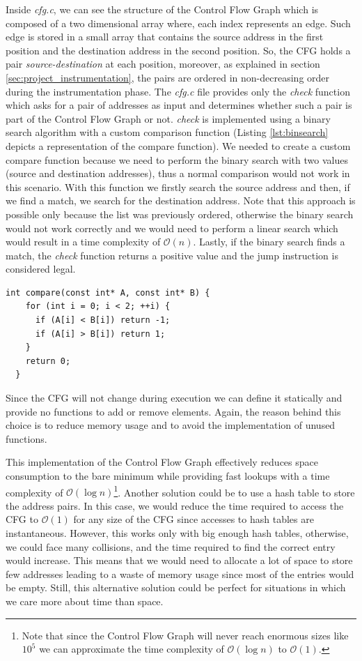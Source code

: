 Inside \textit{cfg.c}, we can see the structure of the Control Flow Graph which is
composed of a two dimensional array where, each index represents an edge. Such edge
is stored in a small array that contains the source address in the first position
and the destination address in the second position. So, the CFG holds a pair \textit{source-destination}
at each position, moreover, as explained in section
\ref{sec:project_instrumentation}, the pairs are ordered in non-decreasing order
during the instrumentation phase. The \textit{cfg.c} file provides only the \textit{check}
function which asks for a pair of addresses as input and determines whether such
a pair is part of the Control Flow Graph or not. \textit{check} is implemented
using a binary search algorithm with a custom comparison function (Listing \ref{lst:binsearch}
depicts a representation of the compare function). We needed to create a custom compare
function because we need to perform the binary search with two values (source
and destination addresses), thus a normal comparison would not work in this
scenario. With this function we firstly search the source address and then, if
we find a match, we search for the destination address. Note that this approach
is possible only because the list was previously ordered, otherwise the binary search
would not work correctly and we would need to perform a linear search which would
result in a time complexity of $\mathcal{O}(n)$. Lastly, if the binary search finds
a match, the \textit{check} function returns a positive value and the jump instruction
is considered legal.

\begin{lstlisting}[style=CStyle, caption= Comparison for binary search, label={lst:binsearch}]
  int compare(const int* A, const int* B) {
    for (int i = 0; i < 2; ++i) {
      if (A[i] < B[i]) return -1;
      if (A[i] > B[i]) return 1;
    }
    return 0;
  }
\end{lstlisting}

Since the CFG will not change during execution we can define it statically and
provide no functions to add or remove elements. Again, the reason behind this
choice is to reduce memory usage and to avoid the implementation of unused
functions.

This implementation of the Control Flow Graph effectively reduces space
consumption to the bare minimum while providing fast lookups with a time
complexity of $\mathcal{O}(\log{n})$\footnote{Note that since the Control Flow
Graph will never reach enormous sizes like $10^{5}$ we can approximate the time
complexity of $\mathcal{O}(\log{n})$ to $\mathcal{O}(1)$.}. Another solution
could be to use a hash table to store the address pairs. In this case, we would
reduce the time required to access the CFG to $\mathcal{O}(1)$ for any size of
the CFG since accesses to hash tables are instantaneous. However, this works
only with big enough hash tables, otherwise, we could face many collisions, and the
time required to find the correct entry would increase. This means that we would
need to allocate a lot of space to store few addresses leading to a waste of
memory usage since most of the entries would be empty. Still, this alternative
solution could be perfect for situations in which we care more about time than
space.

